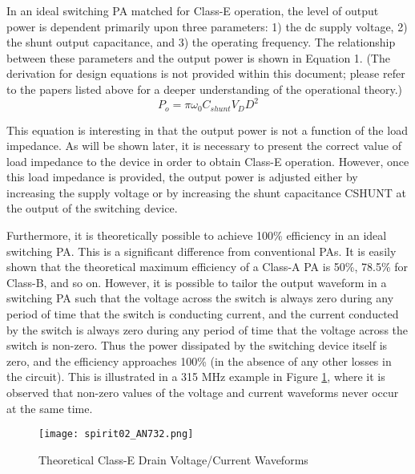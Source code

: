       In an ideal switching PA matched for Class-E operation, the level of output power is dependent 
      primarily upon three parameters: 1) the dc supply voltage, 2) the shunt output capacitance, and 3) 
      the operating frequency. The relationship between these parameters and the output power is shown in 
      Equation 1. (The derivation for design equations is not provided within this document; please refer 
      to the papers listed above for a deeper understanding of the operational theory.)        
      \begin{equation}\label{EXP001:eq_spirit01}
        P_o = \pi\omega_0C_{shunt}V_DD^2
      \end{equation}
      
      This equation is interesting in that the output power is not a function of the load impedance. As 
      will be shown later, it is necessary to present the correct value of load impedance to the device in 
      order to obtain Class-E operation. However, once this load impedance is provided, the output power is 
      adjusted either by increasing the supply voltage or by increasing the shunt capacitance CSHUNT at the 
      output of the switching device.
      
      Furthermore, it is theoretically possible to achieve 100\% efficiency in an ideal switching PA. This 
      is a significant difference from conventional PAs. It is easily shown that the theoretical maximum 
      efficiency of a Class-A PA is 50\%, 78.5\% for Class-B, and so on. However, it is possible to tailor 
      the output waveform in a switching PA such that the voltage across the switch is always zero during 
      any period of time that the switch is conducting current, and the current conducted by the switch is 
      always zero during any period of time that the voltage across the switch is non-zero. Thus the power 
      dissipated by the switching device itself is zero, and the efficiency approaches 100\% (in the 
      absence of any other losses in the circuit). This is illustrated in a 315 MHz example in Figure 
      \ref{EXP001:fig_spirit02}, where it is observed that non-zero values of the voltage and current 
      waveforms never occur at the same time.
      
      \begin{figure}[ht!]  %
        \centering
        \texttt{[image: spirit02\_AN732.png]}
        \caption{Theoretical Class-E Drain Voltage/Current Waveforms}
        \label{EXP001:fig_spirit02}
      \end{figure} 
      
